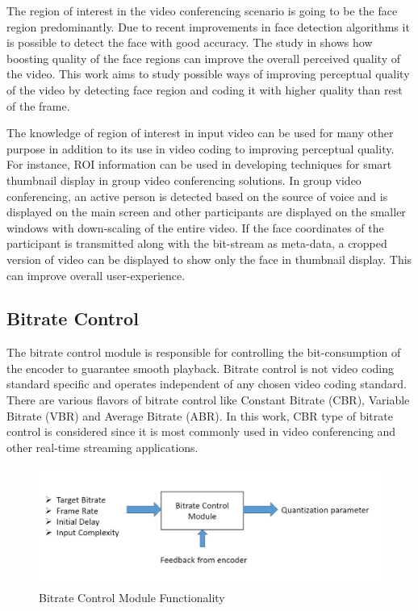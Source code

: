 \documentclass[11pt]{article} %
\begin{document}
The region of interest in the video conferencing scenario is going to be the face region predominantly. Due to recent improvements in face detection algorithms it is possible to detect the face with good accuracy. The study in \cite{HighQualityROICodingForVideoConferencing} shows how boosting quality of the face regions can improve the overall perceived quality of the video. This work aims to study possible ways of improving perceptual quality of the video by detecting face region and coding it with higher quality than rest of the frame.

The knowledge of region of interest in input video can be used for many other purpose in addition to its use in video coding to improving perceptual quality. For instance, ROI information can be used in developing techniques for smart thumbnail display in group video conferencing solutions. In group video conferencing, an active person is detected based on the source of voice and is displayed on the main screen and other participants are displayed on the smaller windows with down-scaling of the entire video. If the face coordinates of the participant is transmitted along with the bit-stream as meta-data, a cropped version of video can be displayed to show only the face in thumbnail display. This can improve overall user-experience.

\subsection{Bitrate Control} \label{Intro:Bitrate-Control}
	The bitrate control module is responsible for controlling the bit-consumption of the encoder to guarantee smooth playback. Bitrate control is not video coding standard specific and operates independent of any chosen video coding standard. There are various flavors of bitrate control like Constant Bitrate (CBR), Variable Bitrate (VBR) and Average Bitrate (ABR). In this work, CBR type of bitrate control is considered since it is most commonly used in video conferencing and other real-time streaming applications. 
\begin{figure}[h]
    \centering
    \includegraphics[scale=0.5]{RC_block}
    \caption{Bitrate Control Module Functionality}
    \label{fig:Bitrate Control Module Functionality}
\end{figure} 
\end{document}

